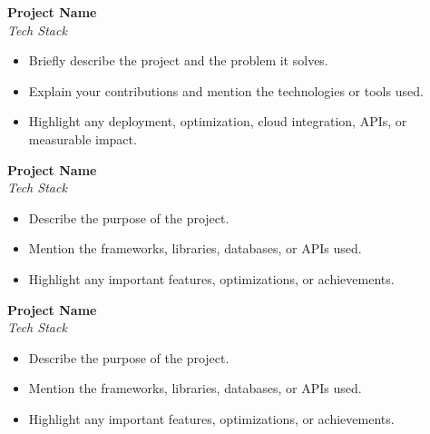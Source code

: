 \documentclass[a4paper,10pt]{article}
\begin{document}
\textbf{Project Name}\\
\textit{Tech Stack}

\vspace{-2mm}

\begin{itemize}
    \item Briefly describe the project and the problem it solves.
    
    \item Explain your contributions and mention the technologies or tools used.
    
    \item Highlight any deployment, optimization, cloud integration, APIs, or measurable impact.
\end{itemize}

\vspace{-2mm}

\textbf{Project Name}\\
\textit{Tech Stack}

\vspace{-2mm}

\begin{itemize}
    \item Describe the purpose of the project.
    
    \item Mention the frameworks, libraries, databases, or APIs used.
    
    \item Highlight any important features, optimizations, or achievements.
\end{itemize}

\vspace{-2mm}
\textbf{Project Name}\\
\textit{Tech Stack}

\vspace{-2mm}

\begin{itemize}
    \item Describe the purpose of the project.
    
    \item Mention the frameworks, libraries, databases, or APIs used.
    
    \item Highlight any important features, optimizations, or achievements.
\end{itemize}

\vspace{-2mm}
\end{document}
